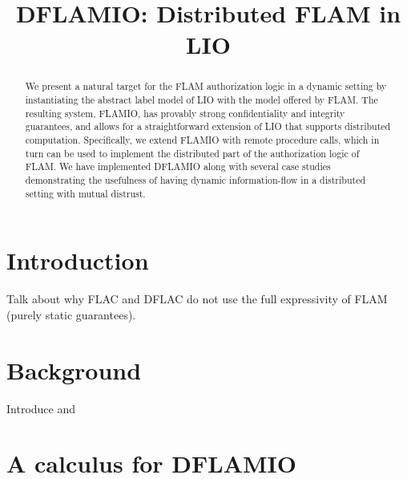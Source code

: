 \documentclass[conference]{IEEEtran}
\begin{document}
\title{DFLAMIO: Distributed FLAM in LIO}

\author{
}

\maketitle

\begin{abstract}
We present a natural target for the FLAM authorization logic in a dynamic setting by instantiating the abstract label model of LIO with the model offered by FLAM. The resulting system, FLAMIO, has provably strong confidentiality and integrity guarantees, and allows for a straightforward extension of LIO that supports distributed computation. Specifically, we extend FLAMIO with remote procedure calls, which in turn can be used to implement the distributed part of the authorization logic of FLAM. We have implemented DFLAMIO along with several case studies demonstrating the usefulness of having dynamic information-flow in a distributed setting with mutual distrust.
\end{abstract}


\section{Introduction}
Talk about why FLAC and DFLAC do not use the full expressivity of FLAM (purely static guarantees).

\section{Background}

Introduce \cite{Arden:2015:FA:2859845.2859998} and \cite{SRMMlio}

\section{A calculus for DFLAMIO}\label{lab:calculus}
\end{document}
